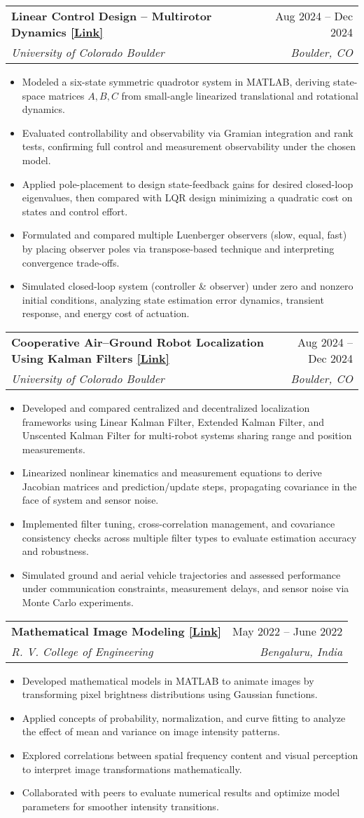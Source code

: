 \documentclass[a4paper,9pt]{article}
\makeatletter
\newcommand{\resumeItemWithoutTitle}[1]{
    \item\small{
        #1 \vspace{-2pt}
    }
}
\newcommand{\resumeSubheading}[4]{
    \vspace{-1pt}\item
        \begin{tabular*}{0.97\textwidth}{l@{\extracolsep{\fill}}r}
            \textbf{#1} & #2 \\
            \textit{#3} & \textit{#4} \\
        \end{tabular*}\vspace{-5pt}
}
\newcommand{\resumeItemListStart}{\begin{itemize}[leftmargin=*]}
\newcommand{\resumeItemListEnd}{\end{itemize}\vspace{-5pt}}
\makeatother
\begin{document}
\resumeSubheading{Linear Control Design – Multirotor Dynamics \textcolor{blue}{\href{https://github.com/theanshuljain/linear-control-design-multirotor-dynamics}{[Link]}}}{Aug 2024 – Dec 2024}
{University of Colorado Boulder}{Boulder, CO}
\resumeItemListStart
\resumeItemWithoutTitle{Modeled a six-state symmetric quadrotor system in MATLAB, deriving state-space matrices \(A, B, C\) from small-angle linearized translational and rotational dynamics.}
\resumeItemWithoutTitle{Evaluated controllability and observability via Gramian integration and rank tests, confirming full control and measurement observability under the chosen model.}
\resumeItemWithoutTitle{Applied pole-placement to design state-feedback gains for desired closed-loop eigenvalues, then compared with LQR design minimizing a quadratic cost on states and control effort.}
\resumeItemWithoutTitle{Formulated and compared multiple Luenberger observers (slow, equal, fast) by placing observer poles via transpose-based technique and interpreting convergence trade-offs.}
\resumeItemWithoutTitle{Simulated closed-loop system (controller \& observer) under zero and nonzero initial conditions, analyzing state estimation error dynamics, transient response, and energy cost of actuation.}
\resumeItemListEnd

\resumeSubheading{Cooperative Air–Ground Robot Localization Using Kalman Filters \textcolor{blue}{\href{https://github.com/theanshuljain/cooperative-air-ground-robot-localization}{[Link]}}}{Aug 2024 – Dec 2024}
{University of Colorado Boulder}{Boulder, CO}
\resumeItemListStart
\resumeItemWithoutTitle{Developed and compared centralized and decentralized localization frameworks using Linear Kalman Filter, Extended Kalman Filter, and Unscented Kalman Filter for multi-robot systems sharing range and position measurements.}
\resumeItemWithoutTitle{Linearized nonlinear kinematics and measurement equations to derive Jacobian matrices and prediction/update steps, propagating covariance in the face of system and sensor noise.}
\resumeItemWithoutTitle{Implemented filter tuning, cross-correlation management, and covariance consistency checks across multiple filter types to evaluate estimation accuracy and robustness.}
\resumeItemWithoutTitle{Simulated ground and aerial vehicle trajectories and assessed performance under communication constraints, measurement delays, and sensor noise via Monte Carlo experiments.}
\resumeItemListEnd

\resumeSubheading{Mathematical Image Modeling \textcolor{blue}{\href{https://github.com/theanshuljain/CartoonifyImage}{[Link]}}}{May 2022 – June 2022}
{R. V. College of Engineering}{Bengaluru, India}
\resumeItemListStart
\resumeItemWithoutTitle{Developed mathematical models in MATLAB to animate images by transforming pixel brightness distributions using Gaussian functions.}
\resumeItemWithoutTitle{Applied concepts of probability, normalization, and curve fitting to analyze the effect of mean and variance on image intensity patterns.}
\resumeItemWithoutTitle{Explored correlations between spatial frequency content and visual perception to interpret image transformations mathematically.}
\resumeItemWithoutTitle{Collaborated with peers to evaluate numerical results and optimize model parameters for smoother intensity transitions.}
\resumeItemListEnd
\end{document}
